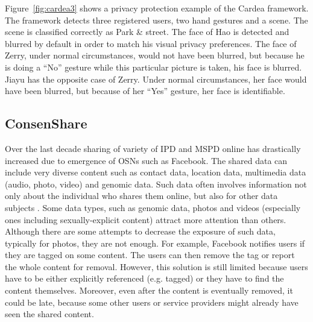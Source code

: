 \documentclass[conference]{IEEEtran}
\begin{document}
Figure~\ref{fig:cardea3} shows a privacy protection example of the Cardea framework. The framework detects three registered users, two hand gestures and a scene. The scene is classified correctly as Park \& street. The face of Hao is detected and blurred by default in order to match his visual privacy preferences. The face of Zerry, under normal circumstances, would not have been blurred, but because he is doing a “No” gesture while this particular picture is taken, his face is blurred. Jiayu has the opposite case of Zerry. Under normal circumstances, her face would have been blurred, but because of her “Yes” gesture, her face is identifiable.


\subsection{ConsenShare}\label{ConsenShare}
Over the last decade sharing of variety of \ac{IPD} and \ac{MSPD} online has drastically increased due to emergence of \ac{OSN}s such as Facebook. The shared data can include very diverse content such as contact data, location data, multimedia data (audio, photo, video) and genomic data. Such data often involves information not only about the individual who shares them online, but also for other data subjects \cite{ahern2007}. Some data types, such as genomic data, photos and videos (especially ones including sexually-explicit content) attract more attention than others. Although there are some attempts to decrease the exposure of such data, typically for photos, they are not enough. For example, Facebook notifies users if they are tagged on some content. The users can then remove the tag or report the whole content for removal. However, this solution is still limited because users have to be either explicitly referenced (e.g. tagged) or they have to find the content themselves. Moreover, even after the content is eventually removed, it could be late, because some other users or service providers might already have seen the shared content. 
\end{document}
